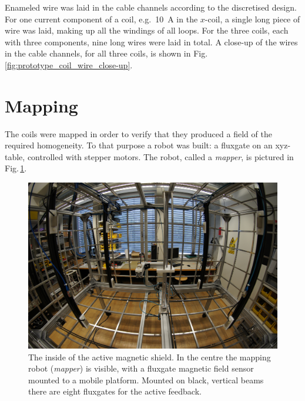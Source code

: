 Enameled wire was laid in the cable channels according to the discretised design.
For one current component of a coil, e.g.\ \SI[detect-all = true]{10}{\ampere} in the $x$-coil, a single long piece of wire was laid, making up all the windings of all loops.
For the three coils, each with three components, nine long wires were laid in total.
A close-up of the wires in the cable channels, for all three coils, is shown in Fig.\,\ref{fig:prototype_coil_wire_close-up}.




\section{Mapping}
\label{sec:prototype_mapping}
The coils were mapped in order to verify that they produced a field of the required homogeneity.
To that purpose a robot was built: a fluxgate on an xyz-table, controlled with stepper motors.
The robot, called a \emph{mapper}, is pictured in Fig.\,\ref{fig:prototype_photo_inside}.

\begin{figure}
  \centering
  \includegraphics[width=0.75\linewidth]{gfx/prototype/DSC03476.JPG}
  \caption{The inside of the active magnetic shield. In the centre the mapping robot (\emph{mapper}) is visible, with a fluxgate magnetic field sensor mounted to a mobile platform. Mounted on black, vertical beams there are eight fluxgates for the active feedback.}\label{fig:prototype_photo_inside}
\end{figure}

